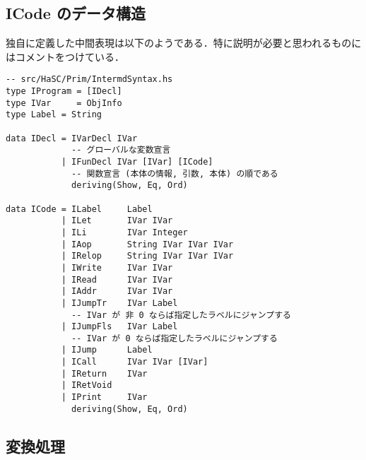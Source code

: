 \documentclass{jsarticle}
\begin{document}
\subsection{ICode のデータ構造}
独自に定義した中間表現は以下のようである．特に説明が必要と思われるものにはコメントをつけている．
\begin{verbatim}
-- src/HaSC/Prim/IntermdSyntax.hs
type IProgram = [IDecl]
type IVar     = ObjInfo
type Label = String

data IDecl = IVarDecl IVar
             -- グローバルな変数宣言
           | IFunDecl IVar [IVar] [ICode]
             -- 関数宣言 (本体の情報, 引数, 本体) の順である
             deriving(Show, Eq, Ord)

data ICode = ILabel     Label
           | ILet       IVar IVar
           | ILi        IVar Integer
           | IAop       String IVar IVar IVar
           | IRelop     String IVar IVar IVar
           | IWrite     IVar IVar
           | IRead      IVar IVar
           | IAddr      IVar IVar
           | IJumpTr    IVar Label
             -- IVar が 非 0 ならば指定したラベルにジャンプする
           | IJumpFls   IVar Label
             -- IVar が 0 ならば指定したラベルにジャンプする
           | IJump      Label
           | ICall      IVar IVar [IVar]
           | IReturn    IVar
           | IRetVoid
           | IPrint     IVar
             deriving(Show, Eq, Ord)
\end{verbatim}
\subsection{変換処理}
\end{document}
